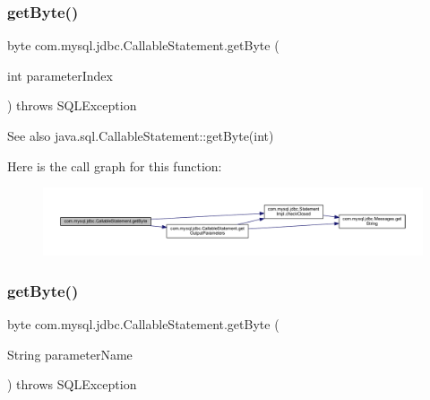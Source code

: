 \subsubsection{\texorpdfstring{get\+Byte()}{getByte()}\hspace{0.1cm}{\footnotesize\ttfamily [1/2]}}
{\footnotesize\ttfamily byte com.\+mysql.\+jdbc.\+Callable\+Statement.\+get\+Byte (\begin{DoxyParamCaption}\item[{int}]{parameter\+Index }\end{DoxyParamCaption}) throws S\+Q\+L\+Exception}

\begin{DoxySeeAlso}{See also}
java.\+sql.\+Callable\+Statement\+::get\+Byte(int) 
\end{DoxySeeAlso}
Here is the call graph for this function\+:\nopagebreak
\begin{figure}[H]
\begin{center}
\leavevmode
\includegraphics[width=350pt]{classcom_1_1mysql_1_1jdbc_1_1_callable_statement_afba99b96d6516655bdf25f4dfa49b687_cgraph}
\end{center}
\end{figure}
\mbox{\label{classcom_1_1mysql_1_1jdbc_1_1_callable_statement_aea67d241da9e8e7001ac6312ff079ae2}} 
\subsubsection{\texorpdfstring{get\+Byte()}{getByte()}\hspace{0.1cm}{\footnotesize\ttfamily [2/2]}}
{\footnotesize\ttfamily byte com.\+mysql.\+jdbc.\+Callable\+Statement.\+get\+Byte (\begin{DoxyParamCaption}\item[{String}]{parameter\+Name }\end{DoxyParamCaption}) throws S\+Q\+L\+Exception}

